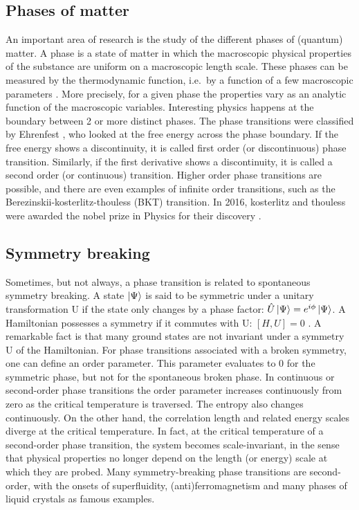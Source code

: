 \subsection{Phases of matter}

An important area of research is the study of the different phases of (quantum) matter. A phase is a state of matter in which the macroscopic physical properties of the substance are uniform on a macroscopic length scale. These phases can be measured by the thermodynamic function, i.e.\ by a function of a few macroscopic parameters  \cite{Nishimori2011}. More precisely, for a given phase the properties vary as an analytic function of the macroscopic variables.
Interesting physics happens at the boundary between 2 or more distinct phases. The phase transitions were classified by Ehrenfest \cite{Jaeger1998}, who looked at the free energy across the phase boundary. If the free energy shows a discontinuity, it is called first order (or discontinuous) phase transition. Similarly, if the first derivative shows a discontinuity, it is called a second order (or continuous) transition. Higher order phase transitions are possible, and there are even examples of infinite order transitions, such as the Berezinskii-kosterlitz-thouless (BKT) transition.  In 2016, kosterlitz and thouless were awarded the nobel prize in Physics for their discovery \cite{Bletenholz2016}.

\subsection{Symmetry breaking}

Sometimes, but not always, a phase transition is  related to spontaneous symmetry breaking. A state $\ket{\Psi}$ is said to be symmetric under a unitary transformation U if the state only changes by a phase factor: $ \hat{U} \ket{\Psi} = e^{i \phi} \ket{\Psi} $. A Hamiltonian possesses a symmetry if it commutes with U: $ [H,U]=0$  \cite{Beekman2019}. A remarkable fact is that many ground states are not invariant under a symmetry U of the Hamiltonian.
For phase transitions associated with a broken symmetry, one can define an order parameter. This parameter evaluates to 0 for the symmetric phase, but not for the spontaneous broken phase.
In continuous or second-order phase transitions the order parameter increases continuously from zero as the critical temperature is traversed. The entropy also changes continuously. On the other hand, the correlation length and related energy scales diverge at the critical temperature. In fact, at the critical temperature of a second-order phase transition, the system becomes scale-invariant, in the sense that physical properties no longer depend on the length (or energy) scale at which they are probed. Many symmetry-breaking phase transitions are second-order, with the onsets of superfluidity, (anti)ferromagnetism and many phases of liquid crystals as famous examples\cite{Beekman2019}.

